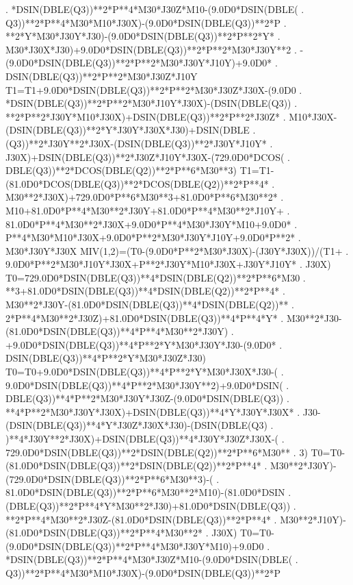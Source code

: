 \begin{framedverbatim}
     . *DSIN(DBLE(Q3))**2*P**4*M30*J30Z*M10-(9.0D0*DSIN(DBLE(
     . Q3))**2*P**4*M30*M10*J30X)-(9.0D0*DSIN(DBLE(Q3))**2*P
     . **2*Y*M30*J30Y*J30)-(9.0D0*DSIN(DBLE(Q3))**2*P**2*Y*
     . M30*J30X*J30)+9.0D0*DSIN(DBLE(Q3))**2*P**2*M30*J30Y**2
     . -(9.0D0*DSIN(DBLE(Q3))**2*P**2*M30*J30Y*J10Y)+9.0D0*
     . DSIN(DBLE(Q3))**2*P**2*M30*J30Z*J10Y
      T1=T1+9.0D0*DSIN(DBLE(Q3))**2*P**2*M30*J30Z*J30X-(9.0D0
     . *DSIN(DBLE(Q3))**2*P**2*M30*J10Y*J30X)-(DSIN(DBLE(Q3))
     . **2*P**2*J30Y*M10*J30X)+DSIN(DBLE(Q3))**2*P**2*J30Z*
     . M10*J30X-(DSIN(DBLE(Q3))**2*Y*J30Y*J30X*J30)+DSIN(DBLE
     . (Q3))**2*J30Y**2*J30X-(DSIN(DBLE(Q3))**2*J30Y*J10Y*
     . J30X)+DSIN(DBLE(Q3))**2*J30Z*J10Y*J30X-(729.0D0*DCOS(
     . DBLE(Q3))**2*DCOS(DBLE(Q2))**2*P**6*M30**3)
      T1=T1-(81.0D0*DCOS(DBLE(Q3))**2*DCOS(DBLE(Q2))**2*P**4*
     . M30**2*J30X)+729.0D0*P**6*M30**3+81.0D0*P**6*M30**2*
     . M10+81.0D0*P**4*M30**2*J30Y+81.0D0*P**4*M30**2*J10Y+
     . 81.0D0*P**4*M30**2*J30X+9.0D0*P**4*M30*J30Y*M10+9.0D0*
     . P**4*M30*M10*J30X+9.0D0*P**2*M30*J30Y*J10Y+9.0D0*P**2*
     . M30*J30Y*J30X
      MIV(1,2)=(T0-(9.0D0*P**2*M30*J30X)-(J30Y*J30X))/(T1+
     . 9.0D0*P**2*M30*J10Y*J30X+P**2*J30Y*M10*J30X+J30Y*J10Y*
     . J30X)
      T0=729.0D0*DSIN(DBLE(Q3))**4*DSIN(DBLE(Q2))**2*P**6*M30
     . **3+81.0D0*DSIN(DBLE(Q3))**4*DSIN(DBLE(Q2))**2*P**4*
     . M30**2*J30Y-(81.0D0*DSIN(DBLE(Q3))**4*DSIN(DBLE(Q2))**
     . 2*P**4*M30**2*J30Z)+81.0D0*DSIN(DBLE(Q3))**4*P**4*Y*
     . M30**2*J30-(81.0D0*DSIN(DBLE(Q3))**4*P**4*M30**2*J30Y)
     . +9.0D0*DSIN(DBLE(Q3))**4*P**2*Y*M30*J30Y*J30-(9.0D0*
     . DSIN(DBLE(Q3))**4*P**2*Y*M30*J30Z*J30)
      T0=T0+9.0D0*DSIN(DBLE(Q3))**4*P**2*Y*M30*J30X*J30-(
     . 9.0D0*DSIN(DBLE(Q3))**4*P**2*M30*J30Y**2)+9.0D0*DSIN(
     . DBLE(Q3))**4*P**2*M30*J30Y*J30Z-(9.0D0*DSIN(DBLE(Q3))
     . **4*P**2*M30*J30Y*J30X)+DSIN(DBLE(Q3))**4*Y*J30Y*J30X*
     . J30-(DSIN(DBLE(Q3))**4*Y*J30Z*J30X*J30)-(DSIN(DBLE(Q3)
     . )**4*J30Y**2*J30X)+DSIN(DBLE(Q3))**4*J30Y*J30Z*J30X-(
     . 729.0D0*DSIN(DBLE(Q3))**2*DSIN(DBLE(Q2))**2*P**6*M30**
     . 3)
      T0=T0-(81.0D0*DSIN(DBLE(Q3))**2*DSIN(DBLE(Q2))**2*P**4*
     . M30**2*J30Y)-(729.0D0*DSIN(DBLE(Q3))**2*P**6*M30**3)-(
     . 81.0D0*DSIN(DBLE(Q3))**2*P**6*M30**2*M10)-(81.0D0*DSIN
     . (DBLE(Q3))**2*P**4*Y*M30**2*J30)+81.0D0*DSIN(DBLE(Q3))
     . **2*P**4*M30**2*J30Z-(81.0D0*DSIN(DBLE(Q3))**2*P**4*
     . M30**2*J10Y)-(81.0D0*DSIN(DBLE(Q3))**2*P**4*M30**2*
     . J30X)
      T0=T0-(9.0D0*DSIN(DBLE(Q3))**2*P**4*M30*J30Y*M10)+9.0D0
     . *DSIN(DBLE(Q3))**2*P**4*M30*J30Z*M10-(9.0D0*DSIN(DBLE(
     . Q3))**2*P**4*M30*M10*J30X)-(9.0D0*DSIN(DBLE(Q3))**2*P

\end{framedverbatim}
